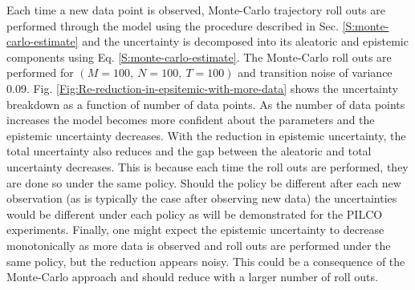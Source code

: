 Each time a new data point is observed, Monte-Carlo trajectory roll outs are performed through the model using the procedure described in Sec. \ref{S:monte-carlo-estimate} and the uncertainty is decomposed into its aleatoric and epistemic components using Eq. \ref{S:monte-carlo-estimate}. The Monte-Carlo roll outs are performed for $(M=100,\: N=100,\: T=100)$ and transition noise of variance 0.09. Fig. \ref{Fig:Re-reduction-in-epsitemic-with-more-data} shows the uncertainty breakdown as a function of number of data points. As the number of data points increases the model becomes more confident about the parameters and the epistemic uncertainty decreases. With the reduction in epistemic uncertainty, the total uncertainty also reduces and the gap between the aleatoric and total uncertainty decreases. This is because each time the roll outs are performed, they are done so under the same policy. Should the policy be different after each new observation (as is typically the case after observing new data) the uncertainties would be different under each policy as will be demonstrated for the PILCO experiments. Finally, one might expect the epistemic uncertainty to decrease monotonically as more data is observed and roll outs are performed under the same policy, but the reduction appears noisy. This could be a consequence of the Monte-Carlo approach and should reduce with a larger number of roll outs.
 
